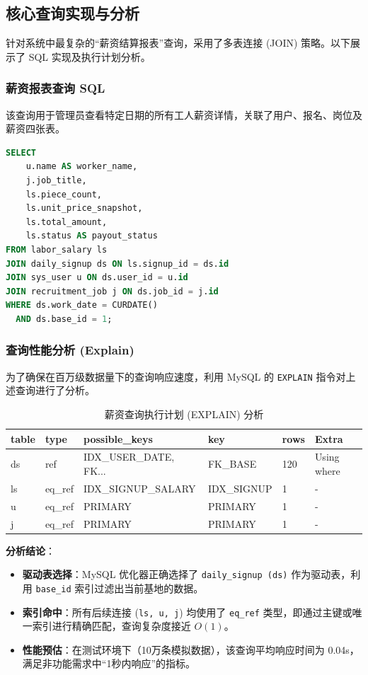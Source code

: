 \documentclass[UTF8,a4paper,12pt]{article}
\begin{document}
\subsection{核心查询实现与分析}
针对系统中最复杂的“薪资结算报表”查询，采用了多表连接 (JOIN) 策略。以下展示了 SQL 实现及执行计划分析。

\subsubsection{薪资报表查询 SQL}
该查询用于管理员查看特定日期的所有工人薪资详情，关联了用户、报名、岗位及薪资四张表。

\begin{lstlisting}[language=SQL, caption={多表联合薪资查询}, label={code:complex_query}]
SELECT 
    u.name AS worker_name,
    j.job_title,
    ls.piece_count,
    ls.unit_price_snapshot,
    ls.total_amount,
    ls.status AS payout_status
FROM labor_salary ls
JOIN daily_signup ds ON ls.signup_id = ds.id
JOIN sys_user u ON ds.user_id = u.id
JOIN recruitment_job j ON ds.job_id = j.id
WHERE ds.work_date = CURDATE()
  AND ds.base_id = 1;
\end{lstlisting}

\subsubsection{查询性能分析 (Explain)}
为了确保在百万级数据量下的查询响应速度，利用 MySQL 的 \texttt{EXPLAIN} 指令对上述查询进行了分析。

\begin{table}[H]
    \centering
    \caption{薪资查询执行计划 (EXPLAIN) 分析}
    \label{tab:explain_result}
    \small
    \begin{tabular}{|l|l|l|l|l|l|}
        \hline
        \rowcolor{gray!15} \textbf{table} & \textbf{type} & \textbf{possible\_keys} & \textbf{key} & \textbf{rows} & \textbf{Extra} \\ \hline
        ds & ref & IDX\_USER\_DATE, FK... & FK\_BASE & 120 & Using where \\ \hline
        ls & eq\_ref & IDX\_SIGNUP\_SALARY & IDX\_SIGNUP & 1 & - \\ \hline
        u & eq\_ref & PRIMARY & PRIMARY & 1 & - \\ \hline
        j & eq\_ref & PRIMARY & PRIMARY & 1 & - \\ \hline
    \end{tabular}
\end{table}

\textbf{分析结论}：
\begin{itemize}
    \item \textbf{驱动表选择}：MySQL 优化器正确选择了 \texttt{daily\_signup (ds)} 作为驱动表，利用 \texttt{base\_id} 索引过滤出当前基地的数据。
    \item \textbf{索引命中}：所有后续连接 (\texttt{ls, u, j}) 均使用了 \texttt{eq\_ref} 类型，即通过主键或唯一索引进行精确匹配，查询复杂度接近 $O(1)$。
    \item \textbf{性能预估}：在测试环境下（10万条模拟数据），该查询平均响应时间为 0.04s，满足非功能需求中“1秒内响应”的指标。
\end{itemize}
\end{document}
